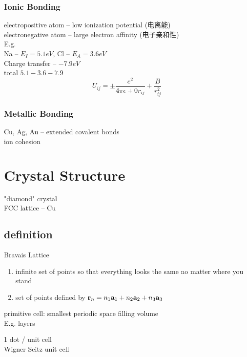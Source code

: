 \documentclass[UTF8]{ctexart} %
\numberwithin{equation}{section}
\begin{document}
\subsubsection{Ionic Bonding}
electropositive atom -- low ionization potential (电离能)\\
electronegative atom -- large electron affinity (电子亲和性)\\
E.g. \\
Na -- $ E_I = 5.1eV $, Cl -- $ E_A = 3.6eV $\\
Charge transfer -- $ -7.9eV $\\
total $ 5.1 - 3.6 - 7.9 $\\
\begin{equation}\label{key}
U_{ij} = \pm\dfrac{e^2}{4\pi\epsilon+0 r_{ij}} + \dfrac{B}{r_{ij}^2}
\end{equation}

\subsubsection{Metallic Bonding}
Cu, Ag, Au -- extended covalent bonds\\
ion cohesion\\

\section{Crystal Structure}
"diamond" crystal\\
FCC lattice -- Cu\\

\subsection{definition}
Bravais Lattice\\
\begin{enumerate}
	\item infinite set of points so that everything looks the same no matter where you stand
	\item set of points defined by $ \vb{r}_n = n_1\vb{a}_1 + n_2\vb{a}_2 + n_3\vb{a}_3 $ 
\end{enumerate}

primitive cell: smallest periodic space filling volume\\

E.g.  layers

1 dot / unit cell\\
Wigner Seitz unit cell\\
\end{document}
